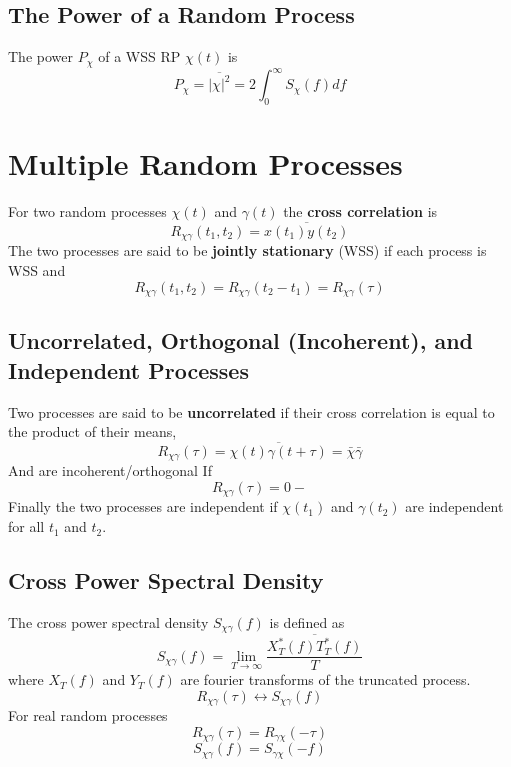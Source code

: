 \documentclass{article}
\begin{document}
    \subsection{The Power of a Random Process}
    The power $P_\chi$ of a WSS RP $\chi(t)$ is 
    \begin{equation}
        P_\chi = \overline{|\chi|^2} = 2\int_0^{\infty}S_\chi(f)df
    \end{equation}

    \section{Multiple Random Processes}
    For two random processes $\chi(t)$ and $\gamma(t)$ the \textbf{cross correlation} is 
    \begin{equation}
        R_{\chi\gamma}(t_1, t_2) = \overline{x(t_1)y(t_2)}
    \end{equation}
    The two processes are said to be \textbf{jointly stationary} (WSS) if each process is WSS and
    \begin{equation}
        R_{\chi\gamma}(t_1, t_2) = R_{\chi\gamma}(t_2-t_1) = R_{\chi\gamma}(\tau)
    \end{equation}

    \subsection{Uncorrelated, Orthogonal (Incoherent), and Independent Processes}
    Two processes are said to be \textbf{uncorrelated} if their cross correlation is equal to the product of their means,
    \begin{equation}
        R_{\chi\gamma}(\tau) = \overline{\chi(t)\gamma(t+\tau)} = \bar{\chi}\bar{\gamma}
    \end{equation}
    And are incoherent/orthogonal If
    \begin{equation}
        R_{\chi\gamma}(\tau) = 0-
    \end{equation}
    Finally the two processes are independent if $\chi(t_1)$ and $\gamma(t_2)$ are independent for all $t_1$ and $t_2$.

    \subsection{Cross Power Spectral Density}
    The cross power spectral density $S_{\chi\gamma}(f)$ is defined as
    \begin{equation}
        S_{\chi\gamma}(f) = \lim_{T \rightarrow \infty} \frac{\overline{X_T^*(f)T_T^*(f)}}{T}
    \end{equation}
    where $X_T(f)$ and $Y_T(f)$ are fourier transforms of the truncated process.
    \begin{equation}
        R_{\chi\gamma}(\tau) \leftrightarrow S_{\chi\gamma}(f)
    \end{equation}
    For real random processes
    \begin{equation}
        R_{\chi\gamma}(\tau) = R_{\gamma\chi}(-\tau)
    \end{equation}
    \begin{equation}
        S_{\chi\gamma}(f) = S_{\gamma\chi}(-f)
    \end{equation}
\end{document}
